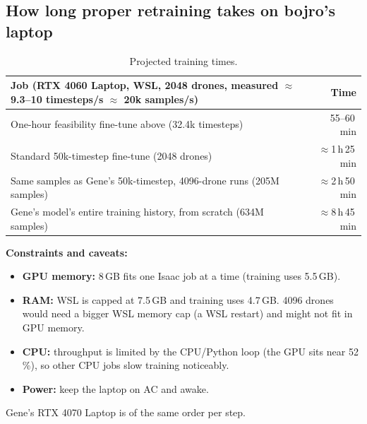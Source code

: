 \documentclass[10pt,a4paper]{article}
\begin{document}
\subsection{How long proper retraining takes on bojro's laptop}
\begin{table}[H]\centering\small
\begin{tabular}{@{}lr@{}}
\toprule
Job (RTX 4060 Laptop, WSL, 2048 drones, measured $\approx$9.3--10 timesteps/s $\approx$ 20k samples/s) & Time \\
\midrule
One-hour feasibility fine-tune above (32.4k timesteps) & 55--60\,min \\
Standard 50k-timestep fine-tune (2048 drones) & $\approx$1\,h\,25\,min \\
Same samples as Gene's 50k-timestep, 4096-drone runs (205M samples) & $\approx$2\,h\,50\,min \\
Gene's model's entire training history, from scratch (634M samples) & $\approx$8\,h\,45\,min \\
\bottomrule
\end{tabular}
\caption{Projected training times.}
\end{table}
\textbf{Constraints and caveats:}
\begin{itemize}
\item \textbf{GPU memory:} 8\,GB fits one Isaac job at a time (training uses 5.5\,GB).
\item \textbf{RAM:} WSL is capped at 7.5\,GB and training uses 4.7\,GB. 4096 drones would need a bigger WSL memory cap (a WSL restart) and might not fit in GPU memory.
\item \textbf{CPU:} throughput is limited by the CPU/Python loop (the GPU sits near 52\,\%), so other CPU jobs slow training noticeably.
\item \textbf{Power:} keep the laptop on AC and awake.
\end{itemize}
Gene's RTX 4070 Laptop is of the same order per step.


\end{document}
